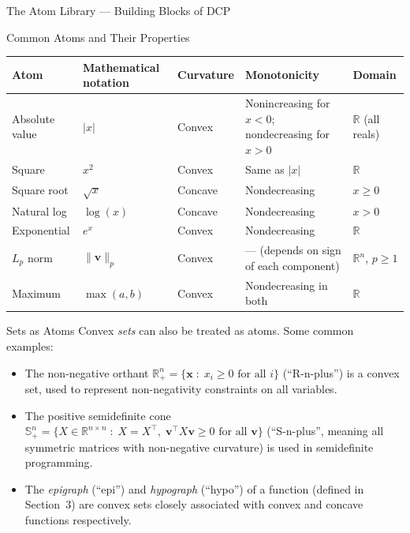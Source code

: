 \documentclass[aspectratio=169,10pt]{beamer}
\begin{document}
\begin{frame}[allowframebreaks]{The Atom Library --- Building Blocks of DCP}
  \begin{block}{Common Atoms and Their Properties}
    \small
    \begin{tabular}{lllll}
      \toprule
      \textbf{Atom} & \textbf{Mathematical notation} & \textbf{Curvature} &
        \textbf{Monotonicity} & \textbf{Domain}\\
      \midrule
      Absolute value  & $|x|$              & Convex
        & Nonincreasing for $x < 0$; nondecreasing for $x > 0$
        & $\mathbb{R}$ (all reals)\\
      Square          & $x^2$              & Convex
        & Same as $|x|$ & $\mathbb{R}$\\
      Square root     & $\sqrt{x}$         & Concave
        & Nondecreasing & $x \geq 0$\\
      Natural log     & $\log(x)$          & Concave
        & Nondecreasing & $x > 0$\\
      Exponential     & $e^x$              & Convex
        & Nondecreasing & $\mathbb{R}$\\
      $L_p$ norm      & $\|\mathbf{v}\|_p$ & Convex
        & --- (depends on sign of each component) & $\mathbb{R}^n$, $p \geq 1$\\
      Maximum         & $\max(a,b)$        & Convex
        & Nondecreasing in both & $\mathbb{R}$\\
      \bottomrule
    \end{tabular}
  \end{block}

  \begin{block}{Sets as Atoms}
    Convex \emph{sets} can also be treated as atoms.  Some common examples:
    \begin{itemize}
      \item The non-negative orthant $\mathbb{R}^n_+ = \{\mathbf{x}
            \;:\; x_i \geq 0 \text{ for all } i\}$ (``R-n-plus'') is a
            convex set, used to represent non-negativity constraints on
            all variables.
      \item The positive semidefinite cone
            $\mathbb{S}^n_+ = \{X \in \mathbb{R}^{n\times n} \;:\;
            X = X^\top,\; \mathbf{v}^\top X \mathbf{v} \geq 0\text{ for all }\mathbf{v}\}$
            (``S-n-plus'', meaning all symmetric matrices with
            non-negative curvature) is used in semidefinite programming.
      \item The \emph{epigraph} (``epi'') and \emph{hypograph}
            (``hypo'') of a function (defined in Section~3) are convex
            sets closely associated with convex and concave functions
            respectively.
    \end{itemize}
  \end{block}


\end{frame}
\end{document}
